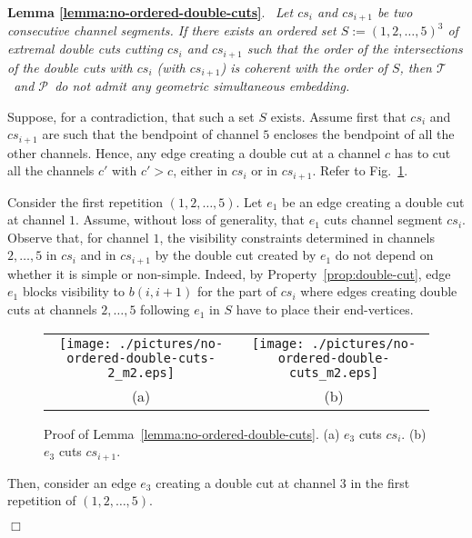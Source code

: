 \documentclass[a4paper,10pt]{llncs}
\newcounter{prop}
\renewenvironment{proof}
{{\bf Proof:}}{\hspace*{\fill}$\Box$\par\vspace{2mm}}
\newcommand{\rephrase}[3]{\noindent\textbf{#1 #2}.~\emph{#3}}
\newcommand{\T}{\mbox{$\mathcal T$ }}
\renewcommand{\P}{\mbox{$\mathcal P$ }}
\begin{document}
\rephrase{Lemma}{\ref{lemma:no-ordered-double-cuts}}{
Let $cs_i$ and $cs_{i+1}$ be two consecutive channel segments. If there exists an ordered set $S:=(1,2,\ldots ,5)^3$ of extremal double cuts cutting $cs_i$ and $cs_{i+1}$ such that the order of the intersections of the double cuts with $cs_i$ (with $cs_{i+1}$) is coherent with the order of $S$, then \T and \P do not admit any geometric simultaneous embedding.
}

\begin{proof}
Suppose, for a contradiction, that such a set $S$ exists. Assume first that $cs_i$ and $cs_{i+1}$ are such that the bendpoint of channel $5$ encloses the bendpoint of all the other channels. Hence, any edge creating a double cut at a channel $c$ has to cut all the channels $c'$ with $c'>c$, either in $cs_i$ or in $cs_{i+1}$. Refer to Fig.~\ref{fig:no-ordered-double-cuts}.

Consider the first repetition $(1,2,\ldots ,5)$. Let $e_1$ be an edge creating a double cut at channel $1$. Assume, without loss of generality, that $e_1$ cuts channel segment $cs_i$. Observe that, for channel $1$, the visibility constraints determined in channels $2,\dots,5$ in $cs_i$ and in $cs_{i+1}$ by the double cut created by $e_1$ do not depend on whether it is simple or non-simple. Indeed, by Property~\ref{prop:double-cut}, edge $e_1$ blocks visibility to $b(i,i+1)$ for the part of $cs_i$ where edges creating double cuts at channels $2,\dots,5$ following $e_1$ in $S$ have to place their end-vertices.

\begin{figure}[ht]
\begin{center}
\begin{tabular}{cc}
\mbox{\texttt{[image: ./pictures/no-ordered-double-cuts-2\_m2.eps]}} \hspace{0.1cm} &
\mbox{\texttt{[image: ./pictures/no-ordered-double-cuts\_m2.eps]}} \\
(a) & (b)\\
\end{tabular}
\caption{Proof of Lemma~\ref{lemma:no-ordered-double-cuts}. (a) $e_3$ cuts $cs_i$. (b) $e_3$ cuts $cs_{i+1}$.}\label{fig:no-ordered-double-cuts}
\end{center}
\end{figure}

Then, consider an edge $e_3$ creating a double cut at channel $3$ in the first repetition of $(1,2,\ldots ,5)$.


\end{proof}
\end{document}
